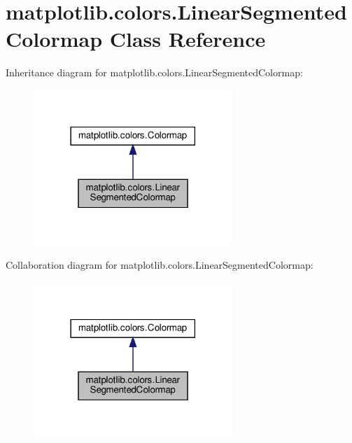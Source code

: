 \hypertarget{classmatplotlib_1_1colors_1_1LinearSegmentedColormap}{}\section{matplotlib.\+colors.\+Linear\+Segmented\+Colormap Class Reference}
\label{classmatplotlib_1_1colors_1_1LinearSegmentedColormap}


Inheritance diagram for matplotlib.\+colors.\+Linear\+Segmented\+Colormap\+:
\nopagebreak
\begin{figure}[H]
\begin{center}
\leavevmode
\includegraphics[width=213pt]{classmatplotlib_1_1colors_1_1LinearSegmentedColormap__inherit__graph}
\end{center}
\end{figure}


Collaboration diagram for matplotlib.\+colors.\+Linear\+Segmented\+Colormap\+:
\nopagebreak
\begin{figure}[H]
\begin{center}
\leavevmode
\includegraphics[width=213pt]{classmatplotlib_1_1colors_1_1LinearSegmentedColormap__coll__graph}
\end{center}
\end{figure}

